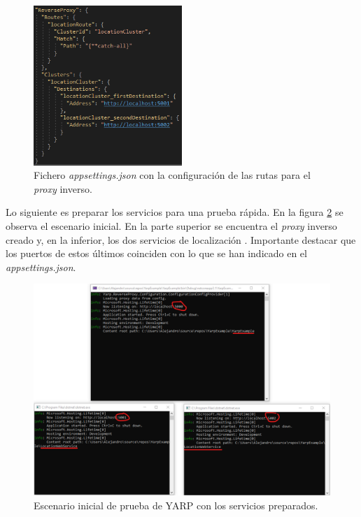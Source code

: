 \documentclass[11pt,spanish,listoffigures]{tfgetsinf}
\begin{document}
\begin{figure}[ht]
\centering
\includegraphics[width=0.50\textwidth]{imagenes/ejemploYARP/appsettings}
\caption{Fichero \emph{appsettings.json} con la configuración de las rutas para el \emph{proxy} inverso.}
	\label{ejemploYARP_appsettings}
\end{figure}

Lo siguiente es preparar los servicios para una prueba rápida. En la figura \ref{ejemploYARP_servicios_preparacion} se observa el escenario inicial. En la parte superior se encuentra el \emph{proxy} inverso creado y, en la inferior, los dos servicios de localización . Importante destacar que los puertos de estos últimos coinciden con lo que se han indicado en el \emph{appsettings.json}.

\begin{figure}[ht]
\centering
\includegraphics[width=1\textwidth]{imagenes/ejemploYARP/servicios_preparacion}
\caption{Escenario inicial de prueba de YARP con los servicios preparados.}
	\label{ejemploYARP_servicios_preparacion}
\end{figure}
\end{document}
